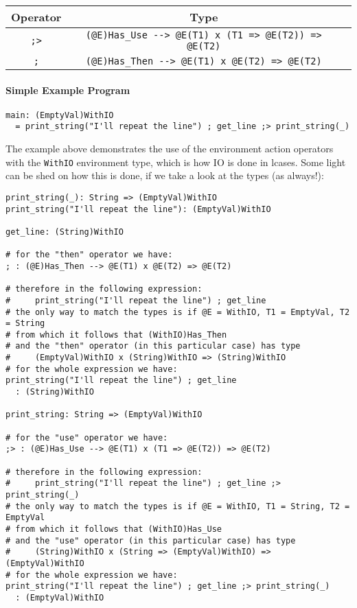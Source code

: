 \documentclass{article}
\begin{document}
\begin{center}
\begin{tabular}{ |c|c|c| }
\hline
Operator & Type
\\
\hline
\hline
\verb|;>| & \verb|(@E)Has_Use --> @E(T1) x (T1 => @E(T2)) => @E(T2)|
\\
\hline
\verb|;| & \verb|(@E)Has_Then --> @E(T1) x @E(T2) => @E(T2)|
\\
\hline
\end{tabular}
\end{center}

\paragraph{Simple Example Program}
\begin{verbatim}
main: (EmptyVal)WithIO
  = print_string("I'll repeat the line") ; get_line ;> print_string(_)
\end{verbatim}
The example above demonstrates the use of the environment action operators with
the \verb|WithIO| environment type, which is how IO is done in lcases. Some
light can be shed on how this is done, if we take a look at the types (as
always!):
\begin{verbatim}
print_string(_): String => (EmptyVal)WithIO
print_string("I'll repeat the line"): (EmptyVal)WithIO

get_line: (String)WithIO

# for the "then" operator we have:
; : (@E)Has_Then --> @E(T1) x @E(T2) => @E(T2)

# therefore in the following expression:
#     print_string("I'll repeat the line") ; get_line
# the only way to match the types is if @E = WithIO, T1 = EmptyVal, T2 = String
# from which it follows that (WithIO)Has_Then
# and the "then" operator (in this particular case) has type
#     (EmptyVal)WithIO x (String)WithIO => (String)WithIO
# for the whole expression we have:
print_string("I'll repeat the line") ; get_line
  : (String)WithIO

print_string: String => (EmptyVal)WithIO

# for the "use" operator we have:
;> : (@E)Has_Use --> @E(T1) x (T1 => @E(T2)) => @E(T2)

# therefore in the following expression:
#     print_string("I'll repeat the line") ; get_line ;> print_string(_)
# the only way to match the types is if @E = WithIO, T1 = String, T2 = EmptyVal
# from which it follows that (WithIO)Has_Use
# and the "use" operator (in this particular case) has type
#     (String)WithIO x (String => (EmptyVal)WithIO) => (EmptyVal)WithIO
# for the whole expression we have:
print_string("I'll repeat the line") ; get_line ;> print_string(_)
  : (EmptyVal)WithIO
\end{verbatim}
\end{document}
